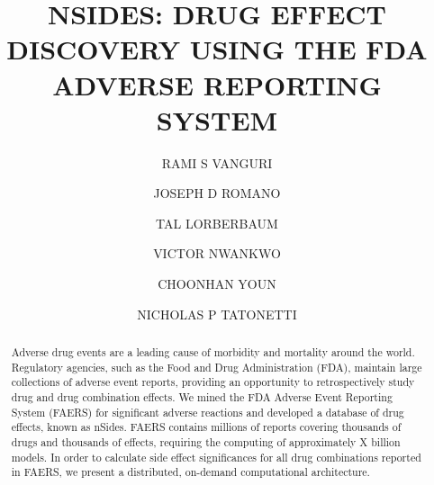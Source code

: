 \documentclass{ws-procs11x85}
\begin{document}
\title{NSIDES: DRUG EFFECT DISCOVERY USING THE FDA ADVERSE REPORTING SYSTEM}

\author{RAMI S VANGURI}

\address{Department of Biomedical Informatics, Columbia University,\\
New York, NY 10032 USA\\
E-mail: r.vanguri@columbia.edu}

\author{JOSEPH D ROMANO}

\address{Department of Biomedical Informatics, Columbia University,\\
New York, NY 10032 USA\\
E-mail: jdr2160@columbia.edu}

\author{TAL LORBERBAUM}

\address{Department of Biomedical Informatics, Columbia University,\\
New York, NY 10032 USA\\
E-mail: tal.lorberbaum@columbia.edu}

\author{VICTOR NWANKWO}

\address{Department of Biomedical Informatics, Columbia University,\\
New York, NY 10032 USA\\
E-mail: vtn2106@columbia.edu}

\author{CHOONHAN YOUN}

\address{San Diego Supercomputer Center, University of California, San Diego,\\
La Jolla, CA 92093 USA\\
E-mail: cyoun@sdsc.edu}

\author{NICHOLAS P TATONETTI}

\address{Department of Biomedical Informatics, Columbia University,\\
New York, NY 10032 USA\\
E-mail: nick.tatonetti@columbia.edu}

\begin{abstract}
Adverse drug events are a leading cause of morbidity and mortality
around the world. Regulatory agencies, such as the Food and Drug
Administration (FDA), maintain large collections of adverse event
reports, providing an opportunity to retrospectively study drug and
drug combination effects.  We mined the FDA Adverse Event Reporting
System (FAERS) for significant adverse reactions and developed a
database of drug effects, known as nSides. FAERS contains millions of
reports covering thousands of drugs and thousands of effects,
requiring the computing of approximately X billion models.  In order
to calculate side effect significances for all drug combinations
reported in FAERS, we present a distributed, on-demand computational
architecture.
\end{abstract}
\end{document}
